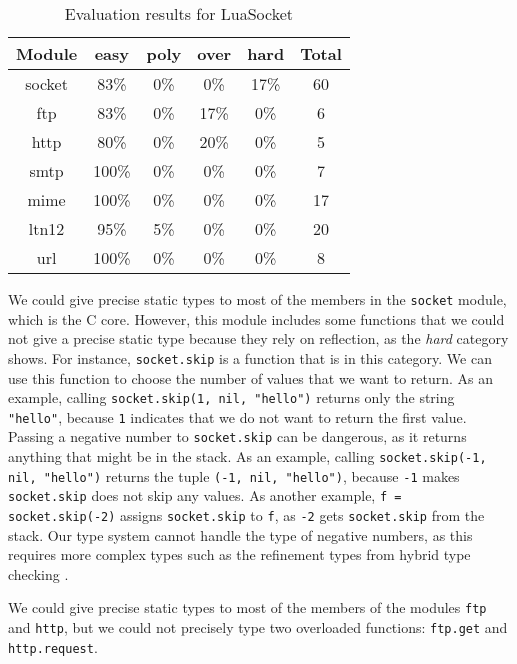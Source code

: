 \begin{table}[!ht]
\begin{center}
\begin{tabular}{|c|c|c|c|c|c|}
\hline
\textbf{Module} & \textbf{easy} & \textbf{poly} & \textbf{over} & \textbf{hard} & \textbf{Total} \\
\hline
socket & 83\% & 0\% & 0\% & 17\% & 60 \\ %
\hline
ftp & 83\% & 0\% & 17\% & 0\% & 6 \\ %
\hline
http & 80\% & 0\% & 20\% & 0\% & 5 \\ %
\hline
smtp & 100\% & 0\% & 0\% & 0\% & 7 \\ %
\hline
mime & 100\% & 0\% & 0\% & 0\% & 17 \\ %
\hline
ltn12 & 95\% & 5\% & 0\% & 0\% & 20 \\ %
\hline
url & 100\% & 0\% & 0\% & 0\% & 8 \\ %
\hline
\end{tabular}
\end{center}
\caption{Evaluation results for LuaSocket}
\label{tab:evalsocket}
\end{table}

We could give precise static types to most of the members
in the \texttt{socket} module, which is the C core.
However, this module includes some functions that
we could not give a precise static type because they
rely on reflection, as the \emph{hard} category shows.
For instance, \texttt{socket.skip} is a function that is
in this category.
We can use this function to choose the number of
values that we want to return.
As an example, calling \texttt{socket.skip(1, nil, "hello")}
returns only the string \texttt{"hello"}, because \texttt{1} indicates
that we do not want to return the first value.
Passing a negative number to \texttt{socket.skip} can be
dangerous, as it returns anything that might be in the stack.
As an example, calling \texttt{socket.skip(-1, nil, "hello")}
returns the tuple \texttt{(-1, nil, "hello")}, because \texttt{-1} makes
\texttt{socket.skip} does not skip any values.
As another example, \texttt{f = socket.skip(-2)} assigns \texttt{socket.skip}
to \texttt{f}, as \texttt{-2} gets \texttt{socket.skip} from the stack.
Our type system cannot handle the type of negative numbers, as
this requires more complex types such as the refinement types from
hybrid type checking \cite{flanagan2006htc}.

We could give precise static types to most of the members of the
modules \texttt{ftp} and \texttt{http}, but we could not precisely type
two overloaded functions: \texttt{ftp.get} and \texttt{http.request}.

